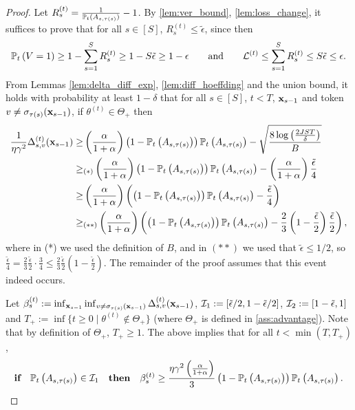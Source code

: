 \documentclass{article}
\theoremstyle{plain}
\theoremstyle{definition}
\theoremstyle{remark}
\begin{document}
\begin{proof}
    Let $R^{(t)}_s = \frac{1}{\P_t(A_{s,\tau(s)})}-1$. By \cref{lem:ver_bound}, \cref{lem:loss_change}, it suffices to prove that for all $s\in[S]$, $R^{(t)}_s \leq \tilde \epsilon$, since then
    \begin{align*}
        \P_t\left(V=1\right) \geq 1 - \sum_{s=1}^S R^{(t)}_s \geq 1-S\tilde\epsilon \geq 1 - \epsilon \qquad \text{and} \qquad \Lcal^{(t)} \leq \sum_{s=1}^S R^{(t)}_s \leq S\tilde \epsilon \leq \epsilon.
    \end{align*} 
     From Lemmas \ref{lem:delta_diff_exp}, \ref{lem:diff_hoeffding} and the union bound, it holds with probability at least $1-\delta$ that for all $s \in [S]$, $t < T$, $\bx_{s-1}$ and token $v\neq \sigma_{\tau(s)}(\bx_{s-1})$, if $\theta^{(t)} \in \Theta_+$ then
    \begin{align}\label{eq: diff_helper}
        \frac{1}{\eta \gamma^2} \Delta^{(t)}_{s, v}(\bx_{s-1}) 
        \geq & \left(\frac{\alpha}{1+\alpha}\right) \left(1 - \P_t\left(A_{s, \tau(s)} \right)\right) 
        \P_t\left(A_{s, \tau(s)}  \right) - \sqrt{\frac{8 \log\left(\frac{2J S T}{\delta}\right)}{B}} \nonumber\\ 
        \geq&_{(*)}\left(\frac{\alpha}{1+\alpha}\right) \left(1 - \P_t\left(A_{s, \tau(s)} \right)\right) 
        \P_t\left(A_{s, \tau(s)}  \right) - \left(\frac{\alpha}{1+\alpha}\right) \frac{\tilde \epsilon}{4} \nonumber \\
        \geq & \left(\frac{\alpha}{1+\alpha}\right)\left( \left(1 - \P_t\left(A_{s, \tau(s)} \right)\right) 
        \P_t\left(A_{s, \tau(s)}  \right) - \frac{\tilde \epsilon}{4} \right) \nonumber \\
        \geq&_{(**)} \left(\frac{\alpha}{1+\alpha}\right)\left( \left(1 - \P_t\left(A_{s, \tau(s)} \right)\right) 
        \P_t\left(A_{s, \tau(s)}  \right) - \frac{2}{3}\left(1-\frac{\tilde \epsilon }{2} \right)\frac{\tilde \epsilon }{2} \right),
    \end{align}
    where in (*) we used the definition of $B$, and in $(**)$ we used that $\tilde \epsilon \leq 1/2$, so $\frac{\tilde \epsilon}{4} = \frac{2}{3} \frac{\tilde \epsilon }{2} \cdot \frac{3}{4} \leq \frac{2}{3} \frac{\tilde \epsilon }{2} \left(1-\frac{\tilde \epsilon }{2} \right)$. The remainder of the proof assumes that this event indeed occurs.

    Let $\beta^{(t)}_{s} := \inf_{\bx_{s-1}} \inf_{v\neq \sigma_{\tau(s)}(\bx_{s-1})} \Delta^{(t)}_{s, v}(\bx_{s-1})$, $\Ical_1 := [\tilde \epsilon / 2 , 1 - \tilde\epsilon/2]$, $\Ical_2 := [1 - \tilde \epsilon, 1]$ and $T_+ := \inf\{t\geq 0 \mid \theta^{(t)} \notin \Theta_+\}$ (where $\Theta_+$ is defined in \cref{ass:advantage}). Note that by definition of $\Theta_+$, $T_+ \geq 1$.
    The above implies that for all $t<\min(T, T_+)$,
    \begin{align}\label{eq: growth}     
        \textbf{if} \quad \P_t\left(A_{s, \tau(s)} \right) \in \Ical_1 \quad \textbf{then} \quad \beta_s^{(t)} 
        \geq \frac{\eta \gamma^2\left(\frac{\alpha}{1+\alpha}\right)}{3} 
        \left(1 - \P_t\left(A_{s, \tau(s)} \right)\right)
      \P_t\left(A_{s, \tau(s)} \right).
    \end{align}


\end{proof}
\end{document}
